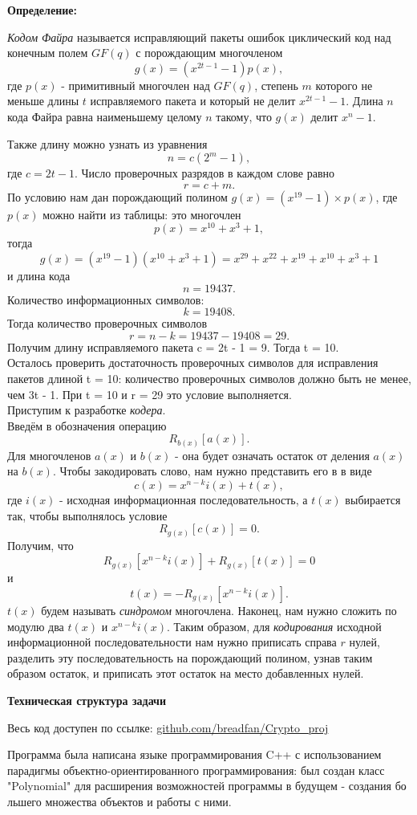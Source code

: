 \documentclass{article}
\begin{document}
   		\textbf{Определение:}
   		
   		\textit{Кодом Файра} называется исправляющий пакеты ошибок циклический код над конечным полем $GF(q)$ с порождающим многочленом
   		$$g(x) = (x^{2t - 1} - 1)p(x),$$
   		где $p(x)$ - примитивный многочлен над $GF(q)$, степень  $m$ которого не меньше длины  $t$ исправляемого пакета и который не делит  $x^{2t - 1} - 1$. Длина $n$ кода Файра равна наименьшему целому $n$ такому, что  $g(x)$ делит $x^n - 1$.
   		
   		Также длину можно узнать из уравнения $$n = c(2^m - 1),$$где $c = 2t - 1$.
   		Число проверочных разрядов в каждом слове равно
   		$$r = c + m.$$ 
   		По условию нам дан порождающий полином $g(x) = (x^{19} - 1) \times p(x)$, где $p(x)$ можно найти из таблицы: это многочлен  $$p(x) = x^{10} + x^3 + 1,$$ тогда $$g(x) = (x^{19} - 1)(x^{10} + x^3 + 1) = x^{29} + x^{22} + x^{19} + x^{10} + x^3 + 1$$  и длина кода $$n = 19437.$$ Количество информационных символов: $$k = 19408.$$ Тогда количество проверочных символов $$r = n - k = 19437 - 19408 = 29.$$
   		Получим длину исправляемого пакета c = 2t - 1 = 9. Тогда t = 10.\\
   		Осталось проверить достаточность проверочных символов для исправления пакетов длиной t = 10: количество проверочных символов должно быть не менее, чем 3t - 1. При t = 10 и r = 29 это условие выполняется.\\  
   		
   		Приступим к разработке \textit{кодера}.\\
   		Введём в обозначения операцию $$R_{b(x)}[a(x)].$$ Для многочленов $a(x)$ и $b(x)$ - она будет означать остаток от деления $a(x)$ на $b(x)$.
   		Чтобы закодировать слово, нам нужно представить его в в виде $$c(x) = x^{n - k}i(x) + t(x),$$ где $i(x)$ - исходная информационная последовательность, а $t(x)$ выбирается так, чтобы выполнялось условие $$R_{g(x)}[c(x)] = 0.$$
   		Получим, что $$R_{g(x)}[x^{n - k}i(x)] + R_{g(x)}[t(x)] = 0$$ и  $$t(x) = -R_{g(x)}[x^{n - k}i(x)].$$
   		$t(x)$ будем называть \textit{синдромом} многочлена. Наконец, нам нужно сложить по модулю два $t(x)$ и $x^{n - k}i(x)$.
   		Таким образом, для \textit{кодирования} исходной информационной последовательности нам нужно приписать справа $r$ нулей, разделить эту последовательность на порождающий полином, узнав таким образом остаток, и приписать этот остаток на место добавленных нулей.
   		
   	\newpage
   		\begin{center}
   			\large \textbf {Техническая структура задачи}
   			
   			\large Весь код доступен по ссылке: \href{https://github.com/breadfan/Crypto_proj}{github.com/breadfan/Crypto\_proj}
   		\end{center}	
   		Программа была написана языке программирования C++ с использованием парадигмы объектно-ориентированного программирования: был создан класс "Polynomial" для расширения возможностей программы в будущем - создания бо$\acute{}$льшего множества объектов и работы с ними.
   		 
\end{document}
